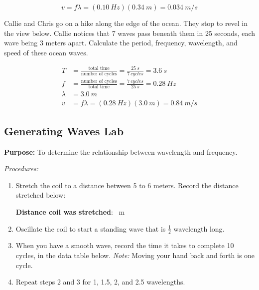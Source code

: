 \documentclass[]{exam}
\begin{document}
\begin{questions}
\begin{solution}
\begin{equation*}
    v = f\lambda = (\SI{0.10}{Hz})(\SI{0.34}{m}) = \boxed{\SI{0.034}{m/s}}
\end{equation*}
\end{solution}

\question
Callie and Chris go on a hike along the edge of the ocean. They stop to revel in the view below. Callie notices that 7 waves pass beneath them in 25 seconds, each wave being 3 meters apart. Calculate the period, frequency, wavelength, and speed of these ocean waves.

\begin{solution}
\begin{align*}
    T &= \frac{\text{total time}}{\text{number of cycles}} = \frac{\SI{25}{s}}{\SI{7}{cycles}} = \boxed{\SI{3.6}{s}} \\[1ex]
    f &= \frac{\text{number of cycles}}{\text{total time}} = \frac{\SI{7}{cycles}}{\SI{25}{s}} = \boxed{\SI{0.28}{Hz}} \\[1ex]
    \lambda &= \boxed{\SI{3.0}{m}} \\[1ex] 
    v &= f \lambda = (\SI{0.28}{Hz})(\SI{3.0}{m}) = \boxed{\SI{0.84}{m/s}}
\end{align*}

\end{solution}

\end{questions}

\clearpage


\subsection*{Generating Waves Lab}

\textbf{Purpose:} To determine the relationship between wavelength and frequency. 

\bigskip

\noindent \textit{Procedures:}

\begin{enumerate}[itemsep=0pt,topsep=0pt]
    \item Stretch the coil to a distance between 5 to 6 meters. Record the distance stretched below:

    \begin{center}
        \textbf{Distance coil was stretched}: \fillin[]\ m
    \end{center}
    
    \item Oscillate the coil to start a standing wave that is $\frac{1}{2}$ wavelength long.
    \item When you have a smooth wave, record the time it takes to complete 10 cycles, in the data table below. \textit{Note:} Moving your hand back and forth is one cycle. 
    \item Repeat steps 2 and 3 for 1, 1.5, 2, and 2.5 wavelengths.
\end{enumerate}
\end{document}

